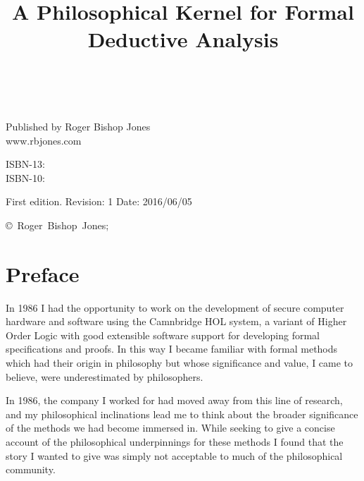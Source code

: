 \documentclass[10pt,titlepage]{book}
\title{A Philosophical Kernel for Formal Deductive Analysis}
\date{\ }
\begin{document}
\frontmatter
                               
\begin{titlepage}
\maketitle

\hspace{2in}

\vfill

\begin{centering}

Published by Roger Bishop Jones\\
www.rbjones.com\\
\vspace{0.2in}

ISBN-13: \\
ISBN-10: 

\vspace{0.2in}

{\footnotesize

First edition. Revision: 1 Date: 2016/06/05

\vspace{0.2in}

\copyright\ Roger~Bishop~Jones;

}%

\end{centering}


\thispagestyle{empty}
\end{titlepage}

\setcounter{tocdepth}{2}
{\parskip-0pt\tableofcontents}
\listoffigures

\mainmatter


\section*{Preface}

In 1986 I had the opportunity to work on the development of secure computer hardware and software using the Camnbridge HOL system, a variant of Higher Order Logic with good extensible software support for developing formal specifications and proofs.
In this way I became familiar with formal methods which had their origin in philosophy but whose significance and value, I came to believe, were underestimated by philosophers.

In 1986, the company I worked for had moved away from this line of research, and my philosophical inclinations lead me to think about the broader significance of the methods we had become immersed in.
While seeking to give a concise account of the philosophical underpinnings for these methods I found that the story I wanted to give was simply not acceptable to much of the philosophical community.
\end{document}
